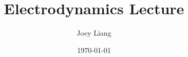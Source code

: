 \documentclass[12pt,english]{article}
\title{Electrodynamics Lecture}
\date{\today}
\author{Joey Liang}
\begin{document}
\begin{titlepage}
\maketitle
\end{titlepage}
\cleardoublepage
{}
\newpage
\tableofcontents
\newpage
\end{document}
